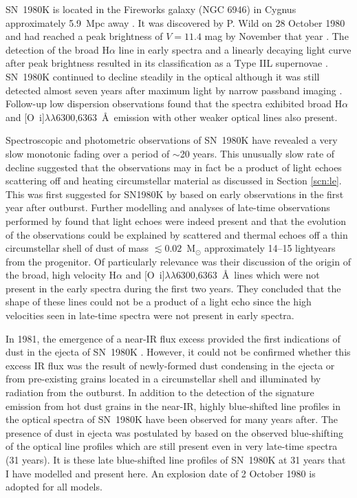 SN~1980K is located in the Fireworks galaxy (NGC 6946) in Cygnus approximately 5.9~Mpc away \citep{Karachentsev2000}.  It was discovered by P. Wild on  28 October 1980 and  had reached a peak brightness of $V=11.4$ mag by November that year \citep{Buta1982}.   The detection of the broad H$\alpha$ line in early spectra and a linearly decaying light curve after peak brightness resulted in its classification as a Type IIL supernovae \citep{Barbon1982}.  SN~1980K continued to decline steadily in the optical although it was still detected almost seven years after maximum light by narrow passband imaging \citep{Fesen1988}.  Follow-up low dispersion observations found that the spectra exhibited broad H$\alpha$ and [O~{\sc i}]$\lambda\lambda$6300,6363~\AA\  emission with other weaker optical lines also present.  

Spectroscopic and photometric observations of SN~1980K have revealed a very slow monotonic fading over a period of $\sim$20 years.  This unusually slow rate of decline suggested that the observations may in fact be a product of light echoes scattering off  and heating circumstellar material as discussed in Section \ref{scn:le}.  This was first suggested for SN1980K by \citet{Chevalier1986} based on early observations in the first year after outburst.  Further modelling and analyses of late-time observations performed by \citet{Sugerman2012}  found that light echoes were indeed present and that the evolution of the observations could be explained by scattered and thermal echoes off a thin circumstellar shell of dust of mass $\lesssim 0.02$~M$_{\odot}$ approximately 14--15 lightyears from the progenitor.  Of particularly relevance was their discussion of the origin of the broad, high velocity H$\alpha$ and [O~{\sc i}]$\lambda\lambda$6300,6363~\AA\ lines which were not present in the early spectra during the first two years.  They concluded that the shape of these lines could not be a product of a light echo since the high velocities seen in late-time spectra were not present in early spectra.

In 1981, the emergence of a near-IR flux excess provided the first indications of dust in the ejecta of SN~1980K \citep{Dwek1983}.  However, it could not be confirmed whether this excess IR flux was the result of newly-formed dust condensing in the ejecta or from pre-existing grains located in a circumstellar shell and illuminated by radiation from the outburst.  In addition to the detection of the signature emission from hot dust grains in the near-IR, highly blue-shifted line profiles in the optical spectra of SN~1980K have been observed for many years after\citep{Fesen1990,Fesen1994,Fesen1995,Fesen1999}.  The presence of dust in ejecta was postulated by \citet{Milisavljevic2012} based on the observed blue-shifting of the optical line profiles which are still present even in very late-time spectra (31 years). It is these late blue-shifted line profiles of SN~1980K at 31 years that I have modelled and present here.  An explosion date of 2 October 1980 \citep{Montes1998} is adopted for all models.


